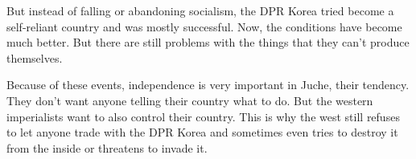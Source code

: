 \documentclass[a4paper]{book}%
\begin{document}
But instead of falling or abandoning socialism, the DPR Korea tried become a self-reliant country and was mostly successful. Now, the conditions have become much better. But there are still problems with the things that they can't produce themselves.

Because of these events, independence is very important in Juche, their tendency. They don't want anyone telling their country what to do. But the western imperialists want to also control their country. This is why the west still refuses to let anyone trade with the DPR Korea and sometimes even tries to destroy it from the inside or threatens to invade it.
\end{document}
